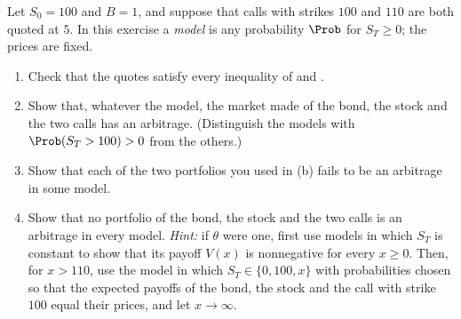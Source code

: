 \begin{exercise}\label{ex:arb-weak}
\hard Let $S_0=100$ and $B=1$, and suppose that calls with strikes $100$ and $110$ are both
quoted at $5$. In this exercise a \emph{model} is any probability $\Prob$ for $S_T\ge0$;
the prices are fixed.
\begin{enumerate}[label=(\alph*)]
  \item Check that the quotes satisfy every inequality of  and
    .
  \item Show that, whatever the model, the market made of the bond, the stock and the two
    calls has an arbitrage. (Distinguish the models with $\Prob(S_T>100)>0$ from the others.)
  \item Show that each of the two portfolios you used in (b) fails to be an arbitrage in some
    model.
  \item Show that no portfolio of the bond, the stock and the two calls is an arbitrage in
    every model. \emph{Hint:} if $\theta$ were one, first use models in which $S_T$ is
    constant to show that its payoff $V(x)$ is nonnegative for every $x\ge0$. Then, for
    $x>110$, use the model in which $S_T\in\{0,100,x\}$ with probabilities chosen so that
    the expected payoffs of the bond, the stock and the call with strike $100$ equal their
    prices, and let $x\to\infty$.
\end{enumerate}
\end{exercise}
